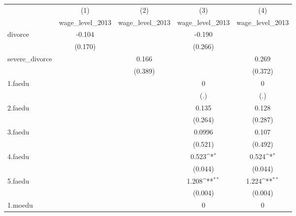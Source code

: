 {
\def\sym#1{\ifmmode^{#1}\else\(^{#1}\)\fi}
\begin{tabular}{l*{4}{c}}
\hline\hline
            &\multicolumn{1}{c}{(1)}&\multicolumn{1}{c}{(2)}&\multicolumn{1}{c}{(3)}&\multicolumn{1}{c}{(4)}\\
            &\multicolumn{1}{c}{wage\_level\_2013}&\multicolumn{1}{c}{wage\_level\_2013}&\multicolumn{1}{c}{wage\_level\_2013}&\multicolumn{1}{c}{wage\_level\_2013}\\
\hline
divorce     &      -0.104         &                     &      -0.190         &                     \\
            &     (0.170)         &                     &     (0.266)         &                     \\
[1em]
severe\_divorce&                     &       0.166         &                     &       0.269         \\
            &                     &     (0.389)         &                     &     (0.372)         \\
[1em]
1.faedu     &                     &                     &           0         &           0         \\
            &                     &                     &         (.)         &         (.)         \\
[1em]
2.faedu     &                     &                     &       0.135         &       0.128         \\
            &                     &                     &     (0.264)         &     (0.287)         \\
[1em]
3.faedu     &                     &                     &      0.0996         &       0.107         \\
            &                     &                     &     (0.521)         &     (0.492)         \\
[1em]
4.faedu     &                     &                     &       0.523\sym{*}  &       0.524\sym{*}  \\
            &                     &                     &     (0.044)         &     (0.044)         \\
[1em]
5.faedu     &                     &                     &       1.208\sym{**} &       1.224\sym{**} \\
            &                     &                     &     (0.004)         &     (0.004)         \\
[1em]
1.moedu     &                     &                     &           0         &           0         \\

\end{tabular}}
